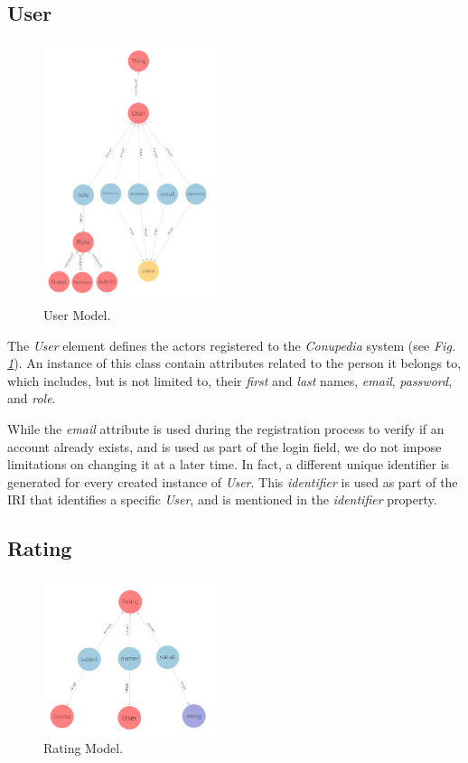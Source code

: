 \documentclass[conference]{IEEEtran}
\begin{document}
    \subsection{User}
        
        \begin{figure}[H]
        \centering
        \includegraphics[width=2.0in]{img/user.png}
        \caption{User Model.}
        \label{user}
        \end{figure}
        
        
        The \textit{User} element defines the actors registered to the \textit{Conupedia} system (see \textit{Fig. \ref{user}}). An instance of this class contain attributes related to the person it belongs to, which includes, but is not limited to, their \textit{first} and \textit{last} names, \textit{email}, \textit{password}, and \textit{role}.
        
        While the \textit{email} attribute is used during the registration process to verify if an account already exists, and is used as part of the login field, we do not impose limitations on changing it at a later time. In fact, a different unique identifier is generated for every created instance of \textit{User}. This \textit{identifier} is used as part of the IRI that identifies a specific \textit{User}, and is mentioned in the \textit{identifier} property.\\
   
    \subsection{Rating}
        \begin{figure}[htpb]
        \centering
        \includegraphics[width=2.0in]{img/rating.png}
        \caption{Rating Model.}
        \label{rating}
        \end{figure}
        
\end{document}
